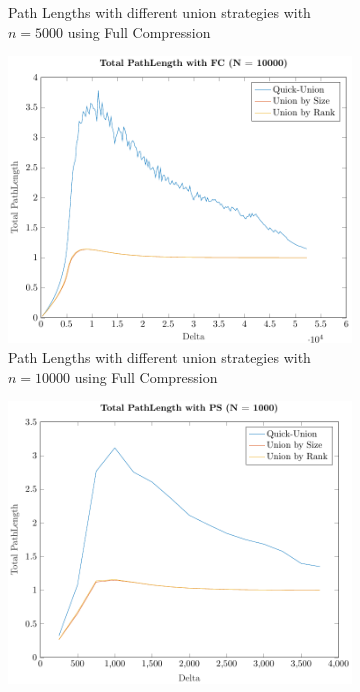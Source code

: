 \begin{figure}[ht]
\begin{subfigure}{0.32\textwidth}
        \caption{Path Lengths with different union strategies with $n = 5000$ using Full Compression}
    \end{subfigure}%
    \hfill
    \begin{subfigure}{0.32\textwidth}
        \centering
        \includegraphics[width=\textwidth]{../images/plotFCFull10000_PathLength.pdf}
        \caption{Path Lengths with different union strategies with $n = 10000$ using Full Compression}
    \end{subfigure}
    \begin{subfigure}{0.32\textwidth}
        \centering
        \includegraphics[width=\textwidth]{../images/plotPSFull1000_PathLength.pdf}

\end{subfigure}
\end{figure}
